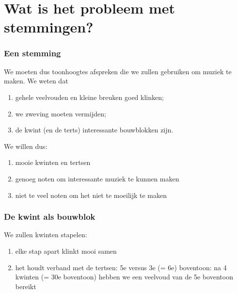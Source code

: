 \documentclass[compress, darktitle, framenumber, handout, totalframenumber]{beamer}
\newenvironment{danger}{\noindent\hangindent=2pc\hangafter=-2%
  \clubpenalty=10000%
  \hbox to0pt{\hskip-\hangindent\dbend\hfill}\small\ignorespaces}%
  {\medbreak\par}
\begin{document}
%
%
%
%
%

\section{Wat is het probleem met stemmingen?}

\begin{frame}[label=tunings]
  \frametitle{Een stemming}

  We moeten dus toonhoogtes afspreken die we zullen gebruiken om muziek te maken. We weten dat
  \begin{enumerate}
    \item gehele veelvouden en kleine breuken goed klinken;
    \item we zweving moeten vermijden;
    \item de kwint (en de terts) interessante bouwblokken zijn.
  \end{enumerate}
  \pause
  We willen dus:
  \begin{enumerate}
    \item mooie kwinten en tertsen
    \item genoeg noten om interessante muziek te kunnen maken
    \item niet te veel noten om het niet te moeilijk te maken
  \end{enumerate}
\end{frame}

\begin{frame}
  \frametitle{De kwint als bouwblok}

  We zullen kwinten stapelen:
  \begin{enumerate}
    \item elke stap apart klinkt mooi samen
    \item het houdt verband met de tertsen: 5e versus 3e (= 6e) boventoon: na 4 kwinten (= 30e boventoon) hebben we een veelvoud van de 5e boventoon bereikt
  \end{enumerate}
\end{frame}
\end{document}
